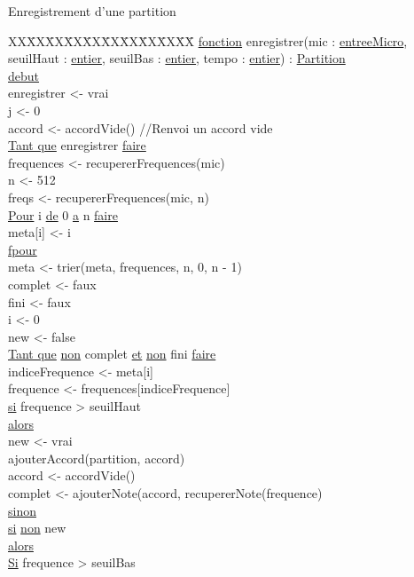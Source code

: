 Enregistrement d'une partition\newline
\begin{tabbing}
\kill XX\=XX\=XX\=XX\=XX\=XX\=XX\=XX\=XX\=XX\=
\kill
\ul{fonction} enregistrer(mic : \ul{entreeMicro}, seuilHaut :  \ul{entier}, seuilBas : \ul{entier}, tempo : \ul{entier}) : \ul{Partition}\\
\ul{debut}\\
\>enregistrer <- vrai\\
\>j <- 0\\
\>accord <- accordVide() //Renvoi un accord vide\\
\>\ul{Tant que} enregistrer \ul{faire}\\
    \>\>frequences <- recupererFrequences(mic)\\
    \>\>n <- 512\\
    \>\>freqs <- recupererFrequences(mic, n)\\
    \>\>\ul{Pour} i \ul{de} 0 \ul{a} n \ul{faire}\\
        \>\>\>meta[i] <- i\\
    \>\>\ul{fpour}\\
    \>\>meta <- trier(meta, frequences, n, 0, n - 1)\\
    \>\>complet <- faux\\
    \>\>fini <- faux\\
    \>\>i <- 0 \\
    \>\>new <- false\\
    \>\>\ul{Tant que} \ul{non} complet \ul{et} \ul{non} fini \ul{faire}\\
        \>\>\>indiceFrequence <- meta[i]\\
        \>\>\>frequence <- frequences[indiceFrequence]\\
        \>\>\>\ul{si} frequence > seuilHaut\\
        \>\>\>\ul{alors}\\
            \>\>\>\>new <- vrai\\
            \>\>\>\>ajouterAccord(partition, accord)\\
            \>\>\>\>accord <- accordVide()\\
            \>\>\>\>complet <- ajouterNote(accord, recupererNote(frequence)\\
        \>\>\>\ul{sinon}\\
            \>\>\>\>\ul{si} \ul{non} new\\
            \>\>\>\>\ul{alors}\\
                \>\>\>\>\>\ul{Si} frequence > seuilBas\\

\end{tabbing}
